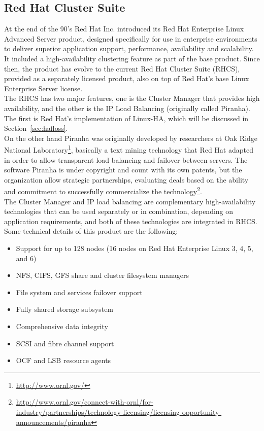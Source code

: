 \documentclass[a4paper, 12pt]{book}
\begin{document}
\subsection{Red Hat Cluster Suite}
\label{subsec:rhcs}

At the end of the 90's Red Hat Inc. introduced its Red Hat Enterprise Linux Advanced Server product, designed specifically for use in enterprise environments to deliver superior application support, performance, availability and scalability. It included a high-availability clustering feature as part of the base product. Since then, the product has evolve to the current Red Hat Cluster Suite (RHCS), provided as a separately licensed product, also on top of Red Hat's base Linux Enterprise Server license.\\

\noindent The RHCS has two major features, one is the Cluster Manager that provides high availability, and the other is the IP Load Balancing (originally called Piranha). The first is Red Hat's implementation of Linux-HA, which will be discussed in Section~\ref{sec:hafloss}.\\

\noindent On the other hand Piranha was originally developed by researchers at Oak Ridge National Laboratory\footnote{\url{http://www.ornl.gov/}}, basically a text mining technology that Red Hat adapted in order to allow transparent load balancing and failover between servers. The software Piranha is under copyright and count with its own patents, but the organization allow strategic partnerships, evaluating deals based on the ability and commitment to successfully commercialize the technology\footnote{\url{http://www.ornl.gov/connect-with-ornl/for-industry/partnerships/technology-licensing/licensing-opportunity-announcements/piranha}}.\\

\noindent The Cluster Manager and IP load balancing are complementary high-availability technologies that can be used separately or in combination, depending on application requirements, and both of these technologies are integrated in RHCS.\\

\noindent Some technical details of this product are the following:

\begin{itemize}
	\item Support for up to 128 nodes (16 nodes on Red Hat Enterprise Linux 3, 4, 5, and 6)
	\item NFS, CIFS, GFS share and cluster filesystem managers
	\item File system and services failover support
	\item Fully shared storage subsystem
	\item Comprehensive data integrity
	\item SCSI and fibre channel support
	\item OCF and LSB resource agents
\end{itemize}
\end{document}
